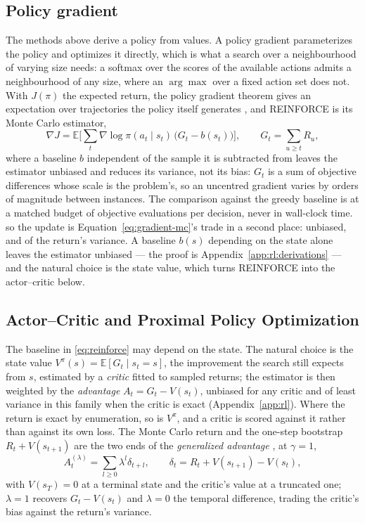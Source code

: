 \documentclass[11pt,a4paper]{article}
\begin{document}
\subsection{Policy gradient}
\label{app:rl:pg}

The methods above derive a policy from values. A policy gradient parameterizes
the policy and optimizes it directly, which is what a search over a
neighbourhood of varying size needs: a softmax over the scores of the available
actions admits a neighbourhood of any size, where an $\arg\max$ over a fixed
action set does not. With $J(\pi)$ the expected return, the policy gradient
theorem gives an expectation over trajectories the policy itself generates
\citep[Ch.~13]{suttonbarto2018}, and REINFORCE is its Monte Carlo estimator,
\begin{equation}
  \nabla J = \mathbb{E}\Big[\sum_{t} \nabla \log \pi(a_t \mid s_t)\,
             \big(G_t - b(s_t)\big)\Big],
  \qquad G_t = \sum_{u \ge t} R_u,
  \label{eq:reinforce}
\end{equation}
where a baseline $b$ independent of the sample it is subtracted from leaves the
estimator unbiased and reduces its variance, not its bias: $G_t$ is a sum of
objective differences whose scale is the problem's, so an uncentred gradient
varies by orders of magnitude between instances. The comparison against the
greedy baseline is at a matched budget of objective evaluations per decision,
never in wall-clock time.
so the update is Equation~\ref{eq:gradient-mc}'s trade in a second
place: unbiased, and of the return's variance. A baseline $b(s)$ depending on
the state alone leaves the estimator unbiased --- the proof is
Appendix~\ref{app:rl:derivations} --- and the natural choice is the state
value, which turns REINFORCE into the actor--critic below.
\subsection{Actor--Critic and Proximal Policy Optimization}
\label{sec:actor-critic}
The baseline in \eqref{eq:reinforce} may depend on the state. The natural
choice is the state value $V^\pi(s) = \mathbb{E}[G_t \mid s_t = s]$, the
improvement the search still expects from $s$, estimated by a \emph{critic}
fitted to sampled returns; the estimator is then weighted by the
\emph{advantage} $A_t = G_t - V(s_t)$, unbiased for any critic and of least
variance in this family when the critic is exact (Appendix~\ref{app:rl}).
Where the return is exact by enumeration, so is $V^\pi$, and a critic is
scored against it rather than against its own loss. The Monte Carlo return and
the one-step bootstrap $R_t + V(s_{t+1})$ are the two ends of the
\emph{generalized advantage} \citep{schulman2016}, at $\gamma = 1$,
\begin{equation}
  A_t^{(\lambda)} = \sum_{l \ge 0} \lambda^l \delta_{t+l},
  \qquad
  \delta_t = R_t + V(s_{t+1}) - V(s_t),
  \label{eq:gae}
\end{equation}
with $V(s_T) = 0$ at a terminal state and the critic's value at a truncated
one; $\lambda = 1$ recovers $G_t - V(s_t)$ and $\lambda = 0$ the temporal
difference, trading the critic's bias against the return's variance.
\end{document}

